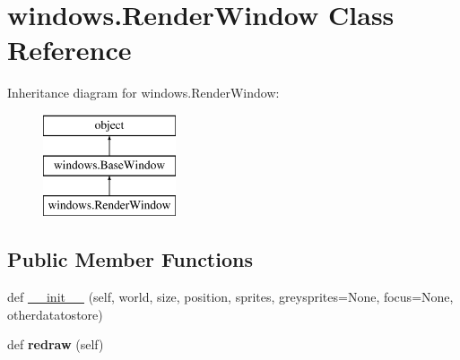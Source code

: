 \hypertarget{classwindows_1_1_render_window}{}\section{windows.\+Render\+Window Class Reference}
\label{classwindows_1_1_render_window}
Inheritance diagram for windows.\+Render\+Window\+:\begin{figure}[H]
\begin{center}
\leavevmode
\includegraphics[height=3.000000cm]{classwindows_1_1_render_window}
\end{center}
\end{figure}
\subsection*{Public Member Functions}
\begin{DoxyCompactItemize}
\item 
def \hyperlink{classwindows_1_1_render_window_a840c51e2589657f752df98335241ee86}{\+\_\+\+\_\+init\+\_\+\+\_\+} (self, world, size, position, sprites, greysprites=None, focus=None, otherdatatostore)
\item 
\hypertarget{classwindows_1_1_render_window_a37628eccf8f8fde4b5f25bda4acaf149}{}def {\bfseries redraw} (self)\label{classwindows_1_1_render_window_a37628eccf8f8fde4b5f25bda4acaf149}

\end{DoxyCompactItemize}
